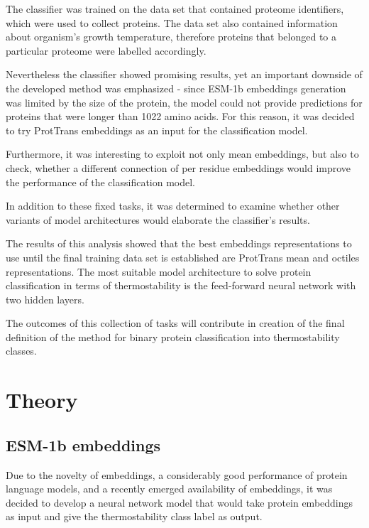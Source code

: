 \documentclass[12pt]{article}
\begin{document}
    The classifier was trained on the data set 
	\cite{engqvist_martin_karl_magnus_2018_1175609} that contained 
	proteome identifiers, which were used 
    to collect proteins. The data set also contained information 
	about organism's growth temperature, therefore proteins that 
	belonged to a particular proteome were labelled accordingly. 

    Nevertheless the classifier showed promising results, yet an
    important downside of the developed method was emphasized -
    since ESM-1b embeddings generation was limited by the size 
    of the protein, the model could not provide predictions for 
    proteins that were longer than 1022 amino acids. For this 
    reason, it was decided to try ProtTrans 
	\cite{elnaggar2020prottrans} embeddings as an 
    input for the classification model.

    Furthermore, it was interesting to exploit not only mean 
    embeddings, but also to check, whether a different 
    connection of per residue embeddings would improve the 
    performance of the classification model.

    In addition to these fixed tasks, it was determined to 
    examine whether other variants of model architectures 
    would elaborate the classifier's results.

	The results of this analysis showed that the best embeddings 
	representations to use until the final training data set is 
	established are ProtTrans mean and octiles representations. 
	The most suitable model architecture to solve protein 
	classification in terms of thermostability is the feed-forward 
	neural network with two hidden layers.

    The outcomes of this collection of tasks will 
    contribute in creation of the final definition of the method
    for binary protein classification into thermostability 
    classes.

	\normalsize
	
	\newpage

	\section{Theory}

	\subsection{ESM-1b embeddings}

	Due to the novelty of embeddings, a considerably good performance of
	protein language models, and a recently emerged availability of embeddings,
	it was decided to develop a neural network model that would take protein
	embeddings as input and give the thermostability class
	label as output.
\end{document}
